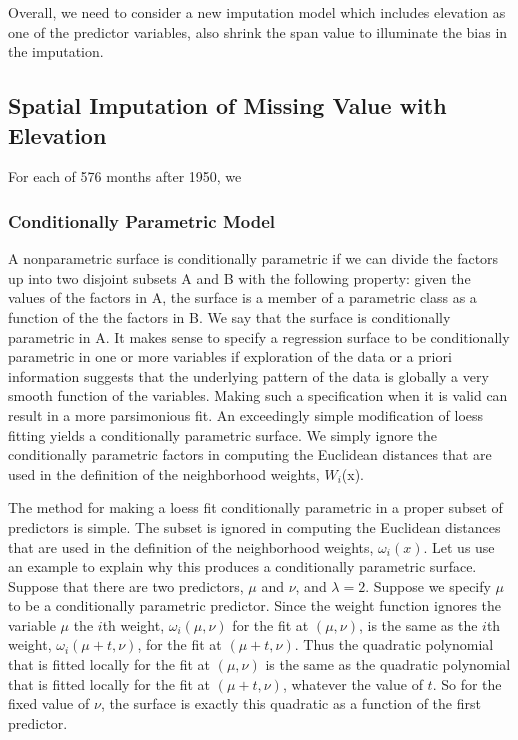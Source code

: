 Overall, we need to consider a new imputation model which includes elevation as
one of the predictor variables, also shrink the span value to illuminate the 
bias in the imputation.

\subsection{Spatial Imputation of Missing Value with Elevation}

For each of 576 months after 1950, we 

\subsubsection{Conditionally Parametric Model}

A nonparametric surface is conditionally
parametric if we can divide the factors up into two disjoint subsets
A and B with the following property: given the values of the factors in A,
the surface is a member of a parametric class as a function of the the factors
in B. We say that the surface is conditionally parametric in A.
It makes sense to specify a regression surface to be conditionally parametric
in one or more variables if exploration of the data or a priori information
suggests that the underlying pattern of the data is globally a very smooth
function of the variables. Making such a specification when it is valid can
result in a more parsimonious fit.
An exceedingly simple modification of loess fitting yields a conditionally
parametric surface. We simply ignore the conditionally parametric factors
in computing the Euclidean distances that are used in the definition of the
neighborhood weights, $W_i$(x).

The method for making a loess fit conditionally parametric in a proper subset of
predictors is simple. The subset is ignored in computing the Euclidean distances 
that are used in the definition of the neighborhood weights, $\omega_i(x)$. Let 
us use an example to explain why this produces a conditionally parametric surface. 
Suppose that there are two predictors, $\mu$ and $\nu$, and $\lambda=2$. Suppose 
we specify $\mu$ to be a conditionally parametric predictor. Since the weight 
function ignores the variable $\mu$ the $i$th weight, $\omega_i(\mu, \nu)$ for 
the fit at $(\mu, \nu)$, is the same as the $i$th weight, $\omega_i(\mu+t, \nu)$, 
for the fit at $(\mu+t, \nu)$. Thus the quadratic polynomial that is fitted locally 
for the fit at $(\mu, \nu)$ is the same as the quadratic polynomial that is fitted 
locally for the fit at $(\mu+t, \nu)$, whatever the value of $t$. So for the fixed 
value of $\nu$, the surface is exactly this quadratic as a function of the first 
predictor.

